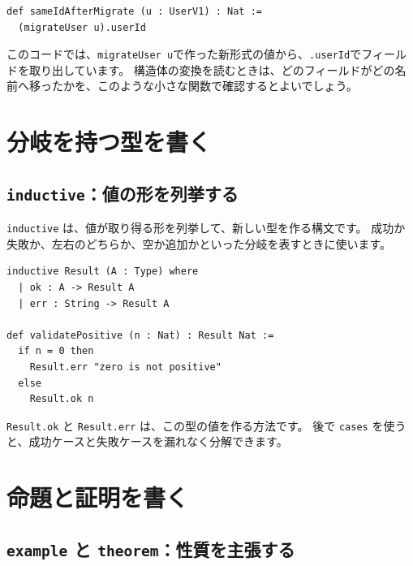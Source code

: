 \begin{listing}[htbp]
\begin{verbatim}
def sameIdAfterMigrate (u : UserV1) : Nat :=
  (migrateUser u).userId
\end{verbatim}
\caption{\texttt{sameIdAfterMigrate}}
\label{lst:appA_field_access}
\end{listing}

このコードでは、\texttt{migrateUser u}で作った新形式の値から、\texttt{.userId}でフィールドを取り出しています。
構造体の変換を読むときは、どのフィールドがどの名前へ移ったかを、このような小さな関数で確認するとよいでしょう。

\section{分岐を持つ型を書く}

\subsection{\texttt{inductive}：値の形を列挙する}

\texttt{inductive} は、値が取り得る形を列挙して、新しい型を作る構文です。
成功か失敗か、左右のどちらか、空か追加かといった分岐を表すときに使います。

\begin{listing}[htbp]
\begin{verbatim}
inductive Result (A : Type) where
  | ok : A -> Result A
  | err : String -> Result A

def validatePositive (n : Nat) : Result Nat :=
  if n = 0 then
    Result.err "zero is not positive"
  else
    Result.ok n
\end{verbatim}
\caption{\texttt{Result}・\texttt{validatePositive}}
\label{lst:appA_inductive}
\end{listing}

\texttt{Result.ok} と \texttt{Result.err} は、この型の値を作る方法です。
後で \texttt{cases} を使うと、成功ケースと失敗ケースを漏れなく分解できます。

\section{命題と証明を書く}

\subsection{\texttt{example} と \texttt{theorem}：性質を主張する}

